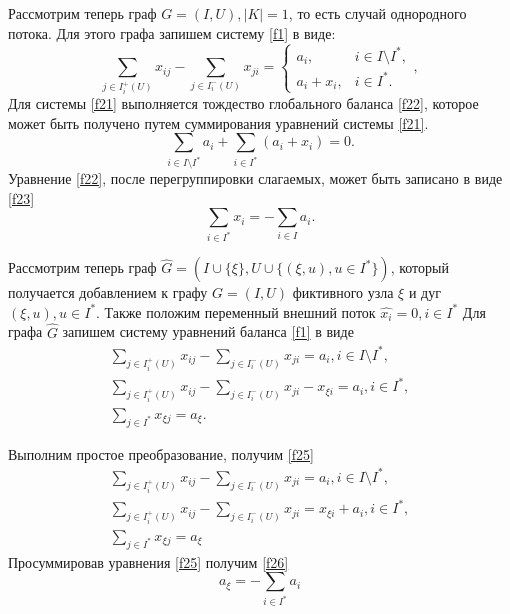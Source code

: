 \documentclass[14pt]{extarticle}%
\begin{document}
Рассмотрим теперь граф $G=(I,U), |K|=1$, то есть случай однородного потока. Для этого графа запишем систему \eqref{f1} в виде:
\begin{equation}\label{f21}
 \sum_{j\in I^+_i(U)} x_{ij}-\sum_{j\in I^-_i(U)}x_{ji}=\left\{\begin{matrix}
a_i, & i\in I\setminus I^*,\\ 
a_i+x_i, & i\in I^*.
\end{matrix}\right.,
\end{equation}
Для системы \eqref{f21} выполняется тождество глобального баланса \eqref{f22}, которое может быть получено путем суммирования уравнений системы \eqref{f21}.
\begin{equation}\label{f22}
\sum_{i\in I\setminus I^*} a_i +\sum_{i\in I^*} (a_i+x_i)=0.
\end{equation}
Уравнение \eqref{f22}, после перегруппировки слагаемых, может быть записано в виде \eqref{f23}
\begin{equation}\label{f23}
\sum_{i\in I^*}x_i=-\sum_{i\in I}a_i.
\end{equation}

Рассмотрим теперь граф $\widehat{G}=(I\cup\{\xi\}, U\cup\{(\xi,u),u\in I^*\})$, который получается добавлением к графу $G=(I,U)$ фиктивного узла $\xi$ и дуг $(\xi,u),u\in I^*$. Также положим переменный внешний поток $\widehat{x_i}=0, i\in I^*$  Для графа $\widehat{G}$ запишем систему уравнений баланса \eqref{f1} в виде
\begin{equation}\label{f24} \begin{gathered}
\sum_{j\in I^+_i(U)} x_{ij}-\sum_{j\in I^-_i(U)}x_{ji}=a_i,  i\in I\setminus I^*, \\
\sum_{j\in I^+_i(U)} x_{ij}-\sum_{j\in I^-_i(U)}x_{ji} -x_{\xi i}=a_i,  i\in I^*,\\
\sum_{j\in I^*} x_{\xi j}=a_\xi.
\end{gathered}
\end{equation}


Выполним простое преобразование, получим \eqref{f25}
\begin{equation}\label{f25} 
\begin{gathered}
\sum_{j\in I^+_i(U)} x_{ij}-\sum_{j\in I^-_i(U)}x_{ji}=a_i, i\in I\setminus I^*,\\
\sum_{j\in I^+_i(U)} x_{ij}-\sum_{j\in I^-_i(U)}x_{ji} =x_{\xi i}+a_i, i\in I^*,\\
\sum_{j\in I^*} x_{\xi j}=a_\xi 
\end{gathered}
\end{equation}
Просуммировав уравнения \eqref{f25} получим \eqref{f26}
\begin{equation}\label{f26}
a_{\xi}=-\sum_{i \in I^*} a_i
\end{equation}
\end{document}
